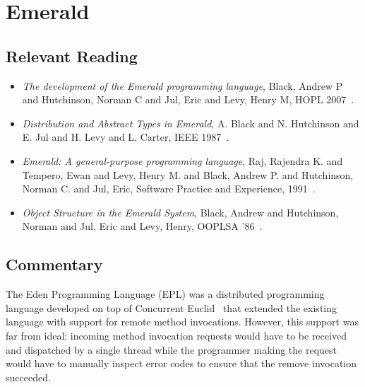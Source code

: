 \section{Emerald}

\subsection{Relevant Reading}

\begin{itemize}
	\item \textit{The development of the Emerald programming language}, Black, Andrew P and Hutchinson, Norman C and Jul, Eric and Levy, Henry M, HOPL 2007~\cite{black2007development}.
	\item \textit{Distribution and Abstract Types in Emerald}, A. Black and N. Hutchinson and E. Jul and H. Levy and L. Carter, IEEE 1987~\cite{1702134}.
	\item \textit{Emerald: A general-purpose programming language}, Raj, Rajendra K. and Tempero, Ewan and Levy, Henry M. and Black, Andrew P. and Hutchinson, Norman C. and Jul, Eric, Software Practice and Experience, 1991~\cite{SPE:SPE4380210107}.
	\item \textit{Object Structure in the Emerald System}, Black, Andrew and Hutchinson, Norman and Jul, Eric and Levy, Henry, OOPLSA '86~\cite{Black:1986:OSE:28697.28706}.
\end{itemize}

\subsection{Commentary}

The Eden Programming Language (EPL) was a distributed programming language developed on top of Concurrent Euclid~\cite{holt1982short} that extended the existing language with support for remote method invocations.  However, this support was far from ideal: incoming method invocation requests would have to be received and dispatched by a single thread while the programmer making the request would have to manually inspect error codes to ensure that the remove invocation succeeded.

